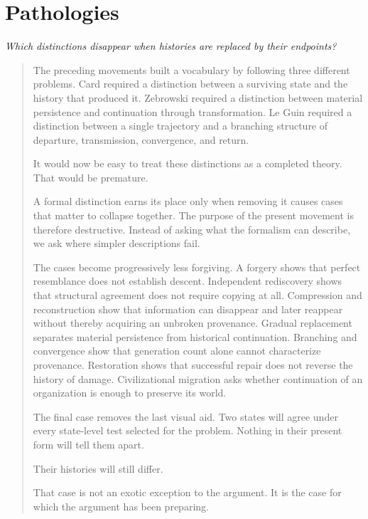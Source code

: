 \documentclass[
  11pt,
  a4paper,
  DIV=12,
  BCOR=0mm,
  parskip=half-
]{scrartcl}
\theoremstyle{definition}
\theoremstyle{plain}
\theoremstyle{remark}
\newcommand{\movementquestion}[1]{%
  \begin{center}
    \small\itshape
    #1
  \end{center}
  \medskip
}
\newenvironment{orientation}
  {%
    \begin{quote}
    \small
    \setlength{\parindent}{1em}
  }
  {%
    \end{quote}
  }
\begin{document}

\section{Pathologies}
\label{mov:pathologies}

\movementquestion{Which distinctions disappear when histories are replaced by their endpoints?}

\begin{orientation}
The preceding movements built a vocabulary by following three different
problems. Card required a distinction between a surviving state and the
history that produced it. Zebrowski required a distinction between material
persistence and continuation through transformation. Le Guin required a
distinction between a single trajectory and a branching structure of
departure, transmission, convergence, and return.

It would now be easy to treat these distinctions as a completed theory. That
would be premature.

A formal distinction earns its place only when removing it causes cases that
matter to collapse together. The purpose of the present movement is therefore
destructive. Instead of asking what the formalism can describe, we ask where
simpler descriptions fail.

The cases become progressively less forgiving. A forgery shows that perfect
resemblance does not establish descent. Independent rediscovery shows that
structural agreement does not require copying at all. Compression and
reconstruction show that information can disappear and later reappear without
thereby acquiring an unbroken provenance. Gradual replacement separates
material persistence from historical continuation. Branching and convergence
show that generation count alone cannot characterize provenance. Restoration
shows that successful repair does not reverse the history of damage.
Civilizational migration asks whether continuation of an organization is
enough to preserve its world.

The final case removes the last visual aid. Two states will agree under every
state-level test selected for the problem. Nothing in their present form will
tell them apart.

Their histories will still differ.

That case is not an exotic exception to the argument. It is the case for
which the argument has been preparing.
\end{orientation}
\end{document}
